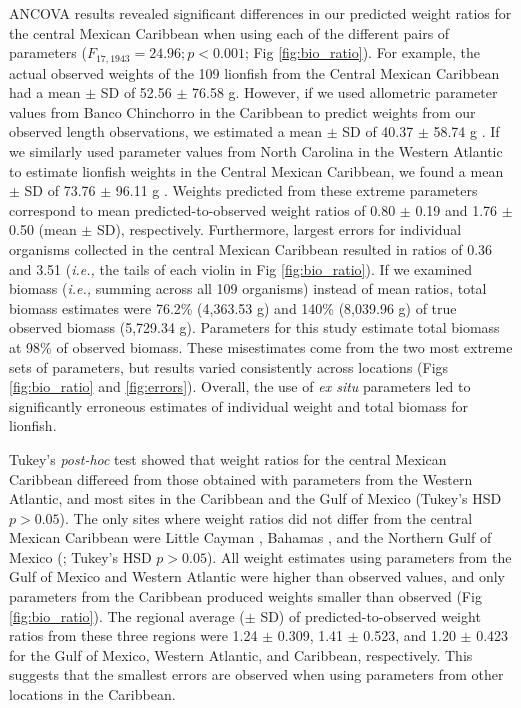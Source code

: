 \documentclass[fleqn,10pt,lineno]{wlpeerj} %
\begin{document}
ANCOVA results revealed significant differences in our predicted weight
ratios for the central Mexican Caribbean when using each of the
different pairs of parameters (\(F_{17, 1943} = 24.96; p < 0.001\); Fig
\ref{fig:bio_ratio}). For example, the actual observed weights of the
109 lionfish from the Central Mexican Caribbean had a mean \(\pm\) SD of
52.56 \(\pm\) 76.58 g. However, if we used allometric parameter values
from Banco Chinchorro in the Caribbean to predict weights from our
observed length observations, we estimated a mean \(\pm\) SD of 40.37
\(\pm\) 58.74 g \citep{sabidoitz_2016}. If we similarly used parameter
values from North Carolina in the Western Atlantic to estimate lionfish
weights in the Central Mexican Caribbean, we found a mean \(\pm\) SD of
73.76 \(\pm\) 96.11 g \citep{barbour_2011}. Weights predicted from these
extreme parameters correspond to mean predicted-to-observed weight
ratios of 0.80 \(\pm\) 0.19 and 1.76 \(\pm\) 0.50 (mean \(\pm\) SD),
respectively. Furthermore, largest errors for individual organisms
collected in the central Mexican Caribbean resulted in ratios of 0.36
and 3.51 (\emph{i.e.,} the tails of each violin in Fig
\ref{fig:bio_ratio}). If we examined biomass (\emph{i.e.,} summing
across all 109 organisms) instead of mean ratios, total biomass
estimates were 76.2\% (4,363.53 g) and 140\% (8,039.96 g) of true
observed biomass (5,729.34 g). Parameters for this study estimate total
biomass at 98\% of observed biomass. These misestimates come from the
two most extreme sets of parameters, but results varied consistently
across locations (Figs \ref{fig:bio_ratio} and \ref{fig:errors}).
Overall, the use of \emph{ex situ} parameters led to significantly
erroneous estimates of individual weight and total biomass for lionfish.

Tukey's \emph{post-hoc} test showed that weight ratios for the central
Mexican Caribbean differeed from those obtained with parameters from the
Western Atlantic, and most sites in the Caribbean and the Gulf of Mexico
(Tukey's HSD \(p > 0.05\)). The only sites where weight ratios did not
differ from the central Mexican Caribbean were Little Cayman
\citep{edwards_2014}, Bahamas \citep{darling_2011},
and the Northern Gulf of Mexico (\citet{dahl_2014}; Tukey's HSD
\(p > 0.05\)). All weight estimates using parameters from the Gulf of
Mexico and Western Atlantic were higher than observed values, and only
parameters from the Caribbean produced weights smaller than observed
(Fig \ref{fig:bio_ratio}). The regional average (\(\pm\) SD) of
predicted-to-observed weight ratios from these three regions were 1.24
\(\pm\) 0.309, 1.41 \(\pm\) 0.523, and 1.20 \(\pm\) 0.423 for the Gulf
of Mexico, Western Atlantic, and Caribbean, respectively. This suggests
that the smallest errors are observed when using parameters from other
locations in the Caribbean.
\end{document}
